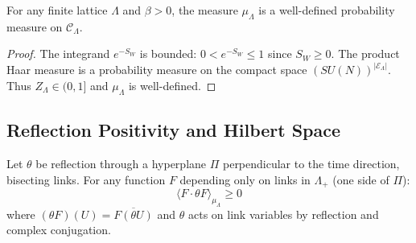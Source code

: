 \begin{theorem}
\label{thm:well_defined}
For any finite lattice $\Lambda$ and $\beta > 0$, the measure $\mu_\Lambda$ is a well-defined probability measure on $\mathcal{C}_\Lambda$.
\end{theorem}

\begin{proof}
The integrand $e^{-S_W}$ is bounded: $0 < e^{-S_W} \leq 1$ since $S_W \geq 0$. The product Haar measure is a probability measure on the compact space $(SU(N))^{|\mathcal{E}_\Lambda|}$. Thus $Z_\Lambda \in (0, 1]$ and $\mu_\Lambda$ is well-defined.
\end{proof}


\subsection{Reflection Positivity and Hilbert Space}

\begin{theorem}
\label{thm:rp_proof}
Let $\theta$ be reflection through a hyperplane $\Pi$ perpendicular to the time direction, bisecting links. For any function $F$ depending only on links in $\Lambda_+$ (one side of $\Pi$):
\begin{equation}
\langle F \cdot \theta F \rangle_{\mu_\Lambda} \geq 0
\end{equation}
where $(\theta F)(U) = \overline{F(\theta U)}$ and $\theta$ acts on link variables by reflection and complex conjugation.
\end{theorem}

